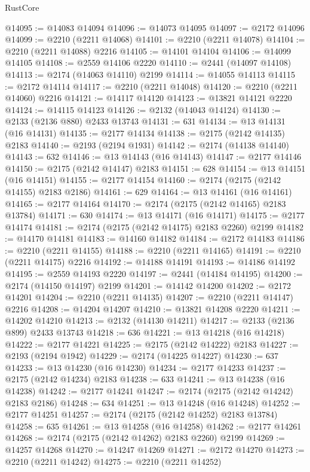\begin{lexlean}{RustCore}
\begin{coremodule}
@14095 := @14083 @14094
@14096 := @14073 @14095
@14097 := @2172 @14096
@14099 := @2210 (@2211 @14068)
@14101 := @2210 (@2211 @14078)
@14104 := @2210 (@2211 @14088) @2216
@14105 := @14101 @14104
@14106 := @14099 @14105
@14108 := @2559 @14106 @2220
@14110 := @2441 (@14097 @14108)
@14113 := @2174 (@14063 @14110) @2199
@14114 := @14055 @14113
@14115 := @2172 @14114
@14117 := @2210 (@2211 @14048)
@14120 := @2210 (@2211 @14060) @2216
@14121 := @14117 @14120
@14123 := @13821 @14121 @2220
@14124 := @14115 @14123
@14126 := @2132 (@14043 @14124)
@14130 := @2133 (@2136 @880) @2433 @13743
@14131 := 631
@14134 := @13 @14131 (@16 @14131)
@14135 := @2177 @14134
@14138 := @2175 (@2142 @14135) @2183
@14140 := @2193 (@2194 @1931)
@14142 := @2174 (@14138 @14140)
@14143 := 632
@14146 := @13 @14143 (@16 @14143)
@14147 := @2177 @14146
@14150 := @2175 (@2142 @14147) @2183
@14151 := 628
@14154 := @13 @14151 (@16 @14151)
@14155 := @2177 @14154
@14160 := @2174 (@2175 (@2142 @14155) @2183 @2186)
@14161 := 629
@14164 := @13 @14161 (@16 @14161)
@14165 := @2177 @14164
@14170 := @2174 (@2175 (@2142 @14165) @2183 @13784)
@14171 := 630
@14174 := @13 @14171 (@16 @14171)
@14175 := @2177 @14174
@14181 := @2174 (@2175 (@2142 @14175) @2183 @2260) @2199
@14182 := @14170 @14181
@14183 := @14160 @14182
@14184 := @2172 @14183
@14186 := @2210 (@2211 @14155)
@14188 := @2210 (@2211 @14165)
@14191 := @2210 (@2211 @14175) @2216
@14192 := @14188 @14191
@14193 := @14186 @14192
@14195 := @2559 @14193 @2220
@14197 := @2441 (@14184 @14195)
@14200 := @2174 (@14150 @14197) @2199
@14201 := @14142 @14200
@14202 := @2172 @14201
@14204 := @2210 (@2211 @14135)
@14207 := @2210 (@2211 @14147) @2216
@14208 := @14204 @14207
@14210 := @13821 @14208 @2220
@14211 := @14202 @14210
@14213 := @2132 (@14130 @14211)
@14217 := @2133 (@2136 @899) @2433 @13743
@14218 := 636
@14221 := @13 @14218 (@16 @14218)
@14222 := @2177 @14221
@14225 := @2175 (@2142 @14222) @2183
@14227 := @2193 (@2194 @1942)
@14229 := @2174 (@14225 @14227)
@14230 := 637
@14233 := @13 @14230 (@16 @14230)
@14234 := @2177 @14233
@14237 := @2175 (@2142 @14234) @2183
@14238 := 633
@14241 := @13 @14238 (@16 @14238)
@14242 := @2177 @14241
@14247 := @2174 (@2175 (@2142 @14242) @2183 @2186)
@14248 := 634
@14251 := @13 @14248 (@16 @14248)
@14252 := @2177 @14251
@14257 := @2174 (@2175 (@2142 @14252) @2183 @13784)
@14258 := 635
@14261 := @13 @14258 (@16 @14258)
@14262 := @2177 @14261
@14268 := @2174 (@2175 (@2142 @14262) @2183 @2260) @2199
@14269 := @14257 @14268
@14270 := @14247 @14269
@14271 := @2172 @14270
@14273 := @2210 (@2211 @14242)
@14275 := @2210 (@2211 @14252)

\end{coremodule}
\end{lexlean}
